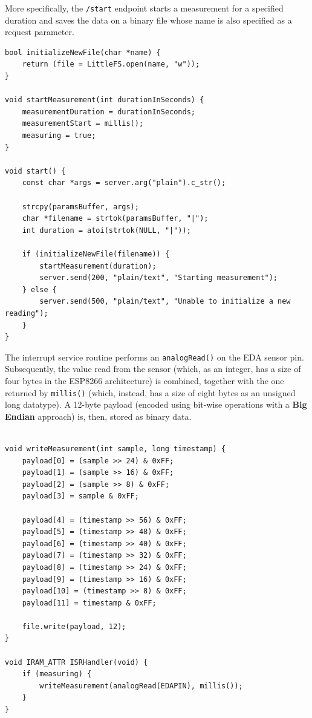 More specifically, the \texttt{/start} endpoint starts a measurement for a specified duration and saves the data on a binary file whose name is also specified as a request parameter.

\begin{verbatim}
bool initializeNewFile(char *name) {
    return (file = LittleFS.open(name, "w"));
}

void startMeasurement(int durationInSeconds) {
    measurementDuration = durationInSeconds;
    measurementStart = millis();
    measuring = true;
}

void start() {
    const char *args = server.arg("plain").c_str();

    strcpy(paramsBuffer, args);
    char *filename = strtok(paramsBuffer, "|");
    int duration = atoi(strtok(NULL, "|"));

    if (initializeNewFile(filename)) {
        startMeasurement(duration);
        server.send(200, "plain/text", "Starting measurement");
    } else {
        server.send(500, "plain/text", "Unable to initialize a new reading");
    }
}
\end{verbatim}

The interrupt service routine performs an \texttt{analogRead()} on the EDA sensor pin. Subsequently, the value read from the sensor (which, as an integer, has a size of four bytes in the ESP8266 architecture) is combined, together with the one returned by \texttt{millis()} (which, instead, has a size of eight bytes as an unsigned long datatype). A 12-byte payload (encoded using bit-wise operations with a \textbf{Big Endian} approach) is, then, stored as binary data.


\pagebreak

\begin{verbatim}

void writeMeasurement(int sample, long timestamp) {
    payload[0] = (sample >> 24) & 0xFF;
    payload[1] = (sample >> 16) & 0xFF;
    payload[2] = (sample >> 8) & 0xFF;
    payload[3] = sample & 0xFF;  

    payload[4] = (timestamp >> 56) & 0xFF;
    payload[5] = (timestamp >> 48) & 0xFF;
    payload[6] = (timestamp >> 40) & 0xFF;
    payload[7] = (timestamp >> 32) & 0xFF;
    payload[8] = (timestamp >> 24) & 0xFF;
    payload[9] = (timestamp >> 16) & 0xFF;
    payload[10] = (timestamp >> 8) & 0xFF;
    payload[11] = timestamp & 0xFF;

    file.write(payload, 12);
}

void IRAM_ATTR ISRHandler(void) {
    if (measuring) {
        writeMeasurement(analogRead(EDAPIN), millis());
    }
}
\end{verbatim}


